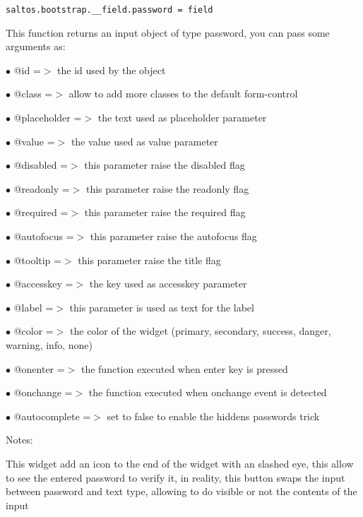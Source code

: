 \documentclass[a4paper]{article}
\begin{document}
\begin{lstlisting}
saltos.bootstrap.__field.password = field
\end{lstlisting}

This function returns an input object of type password, you can pass some arguments as:

\begin{compactitem}
\item[\color{myblue}$\bullet$] @id           =$>$ the id used by the object
\item[\color{myblue}$\bullet$] @class        =$>$ allow to add more classes to the default form-control
\item[\color{myblue}$\bullet$] @placeholder  =$>$ the text used as placeholder parameter
\item[\color{myblue}$\bullet$] @value        =$>$ the value used as value parameter
\item[\color{myblue}$\bullet$] @disabled     =$>$ this parameter raise the disabled flag
\item[\color{myblue}$\bullet$] @readonly     =$>$ this parameter raise the readonly flag
\item[\color{myblue}$\bullet$] @required     =$>$ this parameter raise the required flag
\item[\color{myblue}$\bullet$] @autofocus    =$>$ this parameter raise the autofocus flag
\item[\color{myblue}$\bullet$] @tooltip      =$>$ this parameter raise the title flag
\item[\color{myblue}$\bullet$] @accesskey    =$>$ the key used as accesskey parameter
\item[\color{myblue}$\bullet$] @label        =$>$ this parameter is used as text for the label
\item[\color{myblue}$\bullet$] @color        =$>$ the color of the widget (primary, secondary, success, danger, warning, info, none)
\item[\color{myblue}$\bullet$] @onenter      =$>$ the function executed when enter key is pressed
\item[\color{myblue}$\bullet$] @onchange     =$>$ the function executed when onchange event is detected
\item[\color{myblue}$\bullet$] @autocomplete =$>$ set to false to enable the hiddens passwords trick
\end{compactitem}

Notes:

This widget add an icon to the end of the widget with an slashed eye, this allow to
see the entered password to verify it, in reality, this button swaps the input between
password and text type, allowing to do visible or not the contents of the input
\end{document}
